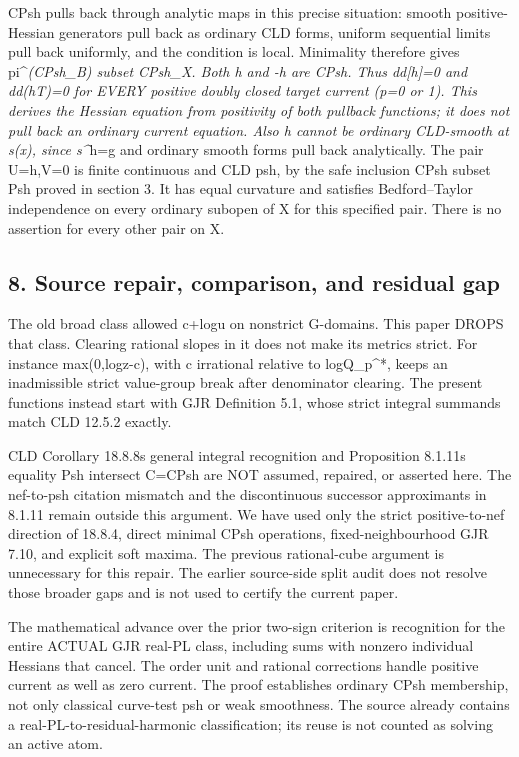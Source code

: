 \documentclass[
  11pt,
]{article}
\begin{document}
CPsh pulls back through analytic maps in this precise situation: smooth
positive-Hessian generators pull back as ordinary CLD forms, uniform
sequential limits pull back uniformly, and the condition is local.
Minimality therefore gives pi\^{}\emph{(CPsh\_B) subset CPsh\_X. Both h
and -h are CPsh. Thus dd{[}h{]}=0 and dd(hT)=0 for EVERY positive doubly
closed target current (p=0 or 1). This derives the Hessian equation from
positivity of both pullback functions; it does not pull back an ordinary
current equation. Also h cannot be ordinary CLD-smooth at s(x), since
s\^{}}h=g and ordinary smooth forms pull back analytically. The pair
U=h,V=0 is finite continuous and CLD psh, by the safe inclusion CPsh
subset Psh proved in section 3. It has equal curvature and satisfies
Bedford--Taylor independence on every ordinary subopen of X for this
specified pair. There is no assertion for every other pair on X.

\subsection{8. Source repair, comparison, and residual
gap}\label{source-repair-comparison-and-residual-gap}

The old broad class allowed c+log\textbar u\textbar{} on nonstrict
G-domains. This paper DROPS that class. Clearing rational slopes in it
does not make its metrics strict. For instance
max(0,log\textbar z\textbar-c), with c irrational relative to
log\textbar Q\_p\^{}*\textbar, keeps an inadmissible strict value-group
break after denominator clearing. The present functions instead start
with GJR Definition 5.1, whose strict integral summands match CLD 12.5.2
exactly.

CLD Corollary 18.8.8\textquotesingle s general integral recognition and
Proposition 8.1.11\textquotesingle s equality Psh intersect C=CPsh are
NOT assumed, repaired, or asserted here. The nef-to-psh citation
mismatch and the discontinuous successor approximants in 8.1.11 remain
outside this argument. We have used only the strict positive-to-nef
direction of 18.8.4, direct minimal CPsh operations, fixed-neighbourhood
GJR 7.10, and explicit soft maxima. The previous rational-cube argument
is unnecessary for this repair. The earlier source-side split audit does
not resolve those broader gaps and is not used to certify the current
paper.

The mathematical advance over the prior two-sign criterion is
recognition for the entire ACTUAL GJR real-PL class, including sums with
nonzero individual Hessians that cancel. The order unit and rational
corrections handle positive current as well as zero current. The proof
establishes ordinary CPsh membership, not only classical curve-test psh
or weak smoothness. The source already contains a
real-PL-to-residual-harmonic classification; its reuse is not counted as
solving an active atom.
\end{document}
